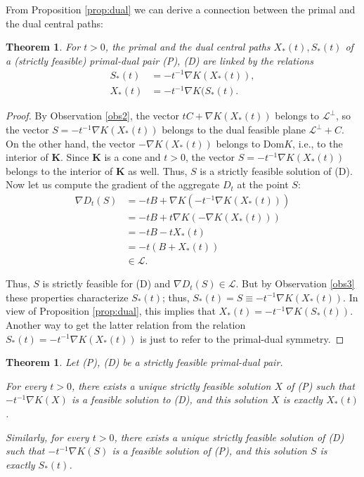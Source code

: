 \documentclass[11pt,a4paper]{article}
\newtheorem{theorem}[thm]{Theorem}
\begin{document}
From Proposition \ref{prop:dual} we can derive a connection between the primal and the dual central paths:

\begin{theorem}
    For $t>0$, the primal and the dual central paths $X_*(t), S_*(t)$ of a (strictly feasible) primal-dual pair (P), (D) are linked by the relations
    \begin{align*}
        S_*(t) &= -t^{-1}\nabla K(X_*(t)),\\
        X_*(t) &= -t^{-1}\nabla K(S_*(t).
    \end{align*}
\end{theorem}

\begin{proof}
By Observation \ref{obs2}, the vector $tC+\nabla K(X_*(t))$ belongs to $\mathcal{L}^\perp$, so the vector $S = -t^{-1}\nabla K(X_*(t))$ belongs to the dual feasible plane $\mathcal{L}^\perp+C$. On the other hand, the vector $-\nabla K(X_*(t))$ belongs to Dom$K$, i.e., to the interior of $\textbf{K}$. Since $\textbf{K}$ is a cone and $t>0$, the vector $S=-t^{-1}\nabla K(X_*(t))$ belongs to the interior of $\textbf{K}$ as well. Thus, $S$ is a strictly feasible solution of (D). Now let us compute the gradient of the aggregate $D_t$ at the point $S$:
\begin{align*}
    \nabla D_t(S) 
    &= -tB+\nabla K(-t^{-1}\nabla K(X_*(t)))\\
    &= -tB+t\nabla K(-\nabla K(X_*(t)))\\
    &= -tB - tX_*(t)\\
    &= -t(B+X_*(t))\\
    &\in \mathcal{L}.
\end{align*}

Thus, $S$ is strictly feasible for (D) and $\nabla D_t(S) \in \mathcal{L}$. But by Observation \ref{obs3} these properties characterize $S_*(t)$; thus, $S_*(t)=S\equiv -t^{-1}\nabla K(X_*(t))$. In view of Proposition \ref{prop:dual}, this implies that $X_*(t) = -t^{-1}\nabla K(S_*(t))$. Another way to get the latter relation from the relation $S_*(t) = -t^{-1}\nabla K(X_*(t))$ is just to refer to the primal-dual symmetry.
\end{proof}

\begin{theorem}\label{teo:charac}
    Let (P), (D) be a strictly feasible primal-dual pair.
    
    For every $t>0$, there exists a unique strictly feasible solution $X$ of (P) such that $-t^{-1}\nabla K(X)$ is a feasible solution to (D), and this solution $X$ is exactly $X_*(t)$.
    
    Similarly, for every $t>0$, there exists a unique strictly feasible solution of (D) such that $-t^{-1}\nabla K(S)$ is a feasible solution of (P), and this solution $S$ is exactly $S_*(t)$.
\end{theorem}
\end{document}
